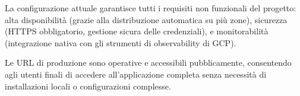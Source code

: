 La configurazione attuale garantisce tutti i requisiti non funzionali del progetto: alta disponibilità (grazie alla distribuzione automatica su più zone), sicurezza (HTTPS obbligatorio, gestione sicura delle credenziali), e monitorabilità (integrazione nativa con gli strumenti di observability di GCP).

Le URL di produzione sono operative e accessibili pubblicamente, consentendo agli utenti finali di accedere all'applicazione completa senza necessità di installazioni locali o configurazioni complesse.